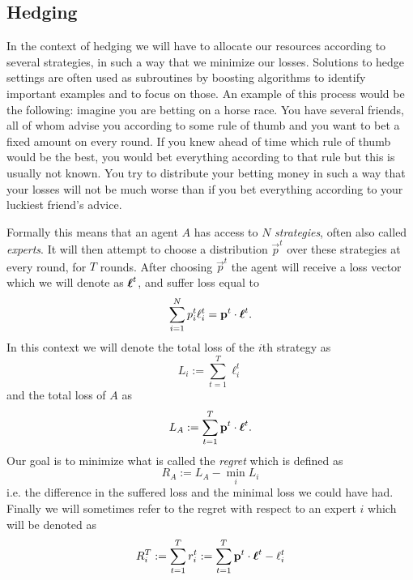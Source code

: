 \subsection{Hedging}
\label{subsec:hedging}
In the context of hedging we will have to allocate our resources according to several strategies, in such a way that we minimize our losses. Solutions to hedge settings are often used as subroutines by boosting algorithms to identify important examples and to focus on those. An example of this process would be the following: imagine you are betting on a horse race. You have several friends, all of whom advise you according to some rule of thumb and you want to bet a fixed amount on every round. If you knew ahead of time which rule of thumb would be the best, you would bet everything according to that rule but this is usually not known. You try to distribute your betting money in such a way that your losses will not be much worse than if you bet everything according to your luckiest friend's advice.  
\par Formally this means that an agent $A$ has access to $N$ \textit{strategies}, often also called \textit{experts}. It will then attempt to choose a distribution $\vec p^t$ over these strategies at every round, for $T$ rounds. After choosing $\vec p^t$ the agent will receive a loss vector which we will denote as $\boldsymbol\ell^t$, and suffer loss equal to $$\sum_{i=1}^N p^t_i\ell_i^t = \mathbf{p}^t \cdot \boldsymbol\ell^t.$$ In this context we will denote the total loss of the $i$th strategy as $$L_i:= \sum_{t=1}^T \ell^t_i$$ and the total loss of $A$ as $$L_A := \sum_{t=1}^T \mathbf{p}^t \cdot \boldsymbol\ell^t.$$ Our goal is to minimize what is called the \textit{regret} which is defined as $$R_A:=L_A - \min_i L_i$$ i.e. the difference in the suffered loss and the minimal loss we could have had. Finally we will sometimes refer to the regret with respect to an expert $i$ which will be denoted as $$R^T_i := \sum^T_{t=1}r_i^t := \sum^T_{t=1} \mathbf{p}^t \cdot \boldsymbol\ell^t -\ell_i^t$$

